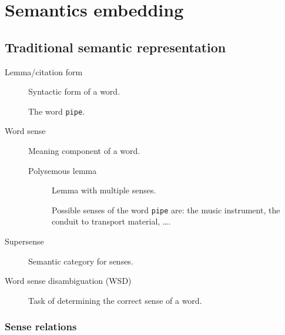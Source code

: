 \chapter{Semantics embedding}


\section{Traditional semantic representation}

\begin{description}
    \item[Lemma/citation form] 
        Syntactic form of a word.

        \begin{example}
            The word \texttt{pipe}.
        \end{example}

    \item[Word sense] 
        Meaning component of a word.

        \begin{description}
            \item[Polysemous lemma] Lemma with multiple senses. 
            \begin{example}
                Possible senses of the word \texttt{pipe} are: the music instrument, the conduit to transport material, \dots.
            \end{example}
        \end{description}

    \item[Supersense] 
        Semantic category for senses.

    \item[Word sense disambiguation (WSD)] 
        Task of determining the correct sense of a word.
\end{description}


\subsection{Sense relations}

